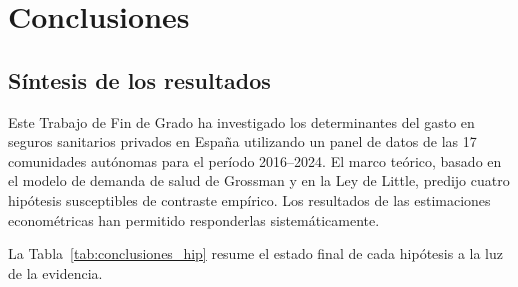 \chapter{Conclusiones}
\label{cap:conclusiones}

\section{Síntesis de los resultados}

Este Trabajo de Fin de Grado ha investigado los determinantes del gasto en seguros
sanitarios privados en España utilizando un panel de datos de las 17 comunidades
autónomas para el período 2016--2024. El marco teórico, basado en el modelo de
demanda de salud de Grossman y en la Ley de Little, predijo cuatro hipótesis
susceptibles de contraste empírico. Los resultados de las estimaciones econométricas
han permitido responderlas sistemáticamente.

La Tabla~\ref{tab:conclusiones_hip} resume el estado final de cada hipótesis a
la luz de la evidencia.

